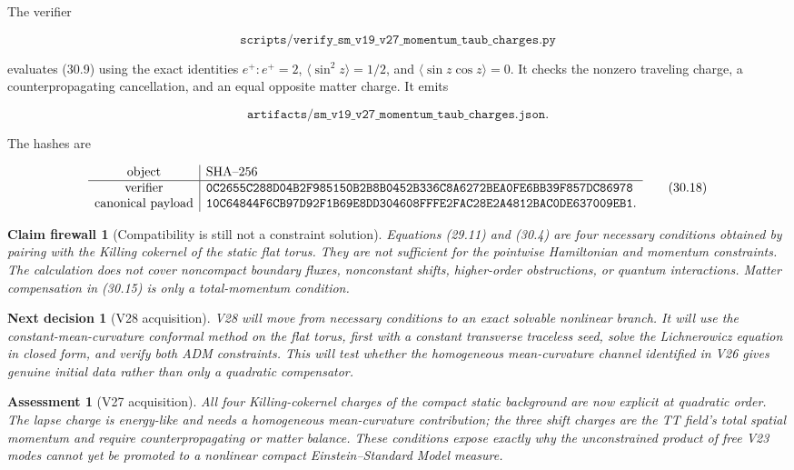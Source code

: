 \documentclass[11pt]{article}
\newtheorem{firewall}[theorem]{Claim firewall}
\newtheorem{decision}[theorem]{Next decision}
\newtheorem{assessment}[theorem]{Assessment}
\theoremstyle{remark}
\begin{document}
The verifier

\[
 \texttt{scripts/verify\_sm\_v19\_v27\_momentum\_taub\_charges.py}
                                                                    \tag{30.16}
\]

evaluates (30.9) using the exact identities
\(e^+:e^+=2\),
\(\langle\sin^2z\rangle=1/2\), and
\(\langle\sin z\cos z\rangle=0\).  It checks the nonzero traveling
charge, a counterpropagating cancellation, and an equal opposite matter
charge.  It emits

\[
 \texttt{artifacts/sm\_v19\_v27\_momentum\_taub\_charges.json}. \tag{30.17}
\]

The hashes are

\[
\begin{array}{c|l}
\hbox{object}&\hbox{SHA--256}\\ \hline
\hbox{verifier}&
\texttt{0C2655C288D04B2F985150B2B8B0452B336C8A6272BEA0FE6BB39F857DC86978}\\
\hbox{canonical payload}&
\texttt{10C64844F6CB97D92F1B69E8DD304608FFFE2FAC28E2A4812BAC0DE637009EB1}.
\end{array}                                                     \tag{30.18}
\]

\begin{firewall}[Compatibility is still not a constraint solution]
\label{fire:v19v27}
Equations (29.11) and (30.4) are four necessary conditions obtained by
pairing with the Killing cokernel of the static flat torus.  They are not
sufficient for the pointwise Hamiltonian and momentum constraints.
The calculation does not cover noncompact boundary fluxes, nonconstant
shifts, higher-order obstructions, or quantum interactions.  Matter
compensation in (30.15) is only a total-momentum condition.
\end{firewall}

\begin{decision}[V28 acquisition]
\label{dec:v19v27-next}
V28 will move from necessary conditions to an exact solvable nonlinear
branch.  It will use the constant-mean-curvature conformal method on the
flat torus, first with a constant transverse traceless seed, solve the
Lichnerowicz equation in closed form, and verify both ADM constraints.
This will test whether the homogeneous mean-curvature channel identified
in V26 gives genuine initial data rather than only a quadratic
compensator.
\end{decision}

\begin{assessment}[V27 acquisition]
\label{ass:v19v27}
All four Killing-cokernel charges of the compact static background are now
explicit at quadratic order.  The lapse charge is energy-like and needs a
homogeneous mean-curvature contribution; the three shift charges are the
TT field's total spatial momentum and require counterpropagating or matter
balance.  These conditions expose exactly why the unconstrained product
of free V23 modes cannot yet be promoted to a nonlinear compact
Einstein--Standard Model measure.
\end{assessment}
\end{document}
